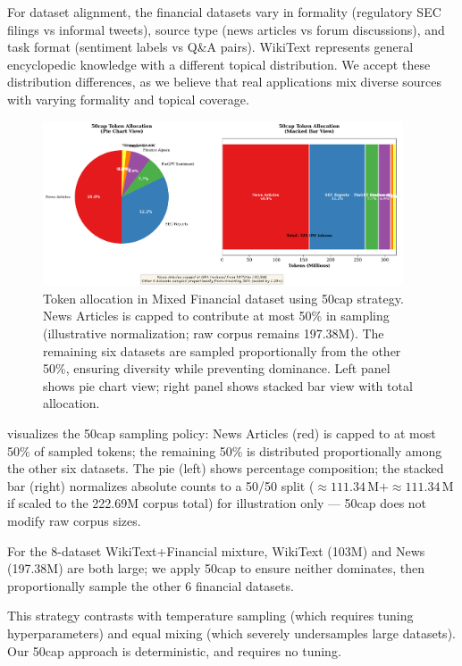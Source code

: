 For dataset alignment, the financial datasets vary in formality (regulatory SEC filings vs informal tweets), source type (news articles vs forum discussions), and task format (sentiment labels vs Q\&A pairs). WikiText represents general encyclopedic knowledge with a different topical distribution. We accept these distribution differences, as we believe that real applications mix diverse sources with varying formality and topical coverage.

\begin{figure}[h]
\centering
\includegraphics[width=0.95\textwidth]{figures/diagram_50cap.png}
\caption[50cap Mixture Strategy Visualization]{Token allocation in Mixed Financial dataset using 50cap strategy. News Articles is capped to contribute at most 50\% in sampling (illustrative normalization; raw corpus remains 197.38M). The remaining six datasets are sampled proportionally from the other 50\%, ensuring diversity while preventing dominance. Left panel shows pie chart view; right panel shows stacked bar view with total allocation.}
\label{fig:diagram_50cap}
\end{figure}

 visualizes the 50cap sampling policy: News Articles (red) is capped to at most 50\% of sampled tokens; the remaining 50\% is distributed proportionally among the other six datasets. The pie (left) shows percentage composition; the stacked bar (right) normalizes absolute counts to a 50/50 split (\(\approx\!111.34\,\text{M}+\approx\!111.34\,\text{M}\) if scaled to the 222.69M corpus total) for illustration only — 50cap does not modify raw corpus sizes.

For the 8-dataset WikiText+Financial mixture, WikiText (103M) and News (197.38M) are both large; we apply 50cap to ensure neither dominates, then proportionally sample the other 6 financial datasets.

This strategy contrasts with temperature sampling (which requires tuning hyperparameters) and equal mixing (which severely undersamples large datasets). Our 50cap approach is deterministic, and requires no tuning.

